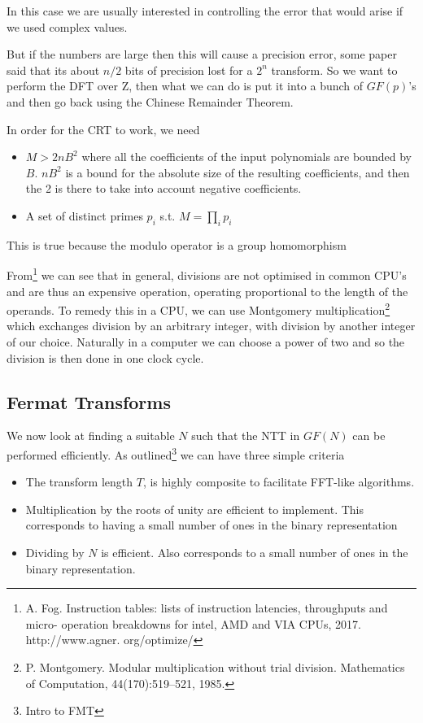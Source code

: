 In this case we are usually interested in controlling the error that would arise if we used complex values. 

But if the numbers are large then this will cause a precision error, some paper said that its about $n / 2$ bits of precision lost for a $2^n$ transform. So we want to perform the DFT over Z, then what we can do is put it into a bunch of $GF(p)$'s and then go back using the Chinese Remainder Theorem. 

In order for the CRT to work, we need

\begin{itemize}
\item $M > 2nB^2$ where all the coefficients of the input polynomials are bounded by $B$. $nB^2$ is a bound for the absolute size of the resulting coefficients, and then the 2 is there to take into account negative coefficients.
\item A set of distinct primes $p_i$ s.t. $M = \prod_i p_i$
\end{itemize}

This is true because the modulo operator is a group homomorphism


From\footnote{A. Fog. Instruction tables: lists of instruction latencies, throughputs and micro- operation breakdowns for intel, AMD and VIA CPUs, 2017. http://www.agner. org/optimize/} we can see that in general, divisions are not optimised in common CPU's and are thus an expensive operation, operating proportional to the length of the operands. To remedy this in a CPU, we can use Montgomery multiplication\footnote{P. Montgomery. Modular multiplication without trial division. Mathematics of Computation, 44(170):519–521, 1985.} which exchanges division by an arbitrary integer, with division by another integer of our choice. Naturally in a computer we can choose a power of two and so the division is then done in one clock cycle.


\subsection{Fermat Transforms}
\label{subsec:fermat-transforms}

We now look at finding a suitable $N$ such that the NTT in $GF(N)$ can be performed efficiently. As outlined\footnote{Intro to FMT} we can have three simple criteria
\begin{itemize}
\item The transform length $T$, is highly composite to facilitate FFT-like algorithms.
\item Multiplication by the roots of unity are efficient to implement. This corresponds to having a small number of ones in the binary representation
\item Dividing by $N$ is efficient. Also corresponds to a small number of ones in the binary representation.
\end{itemize}

